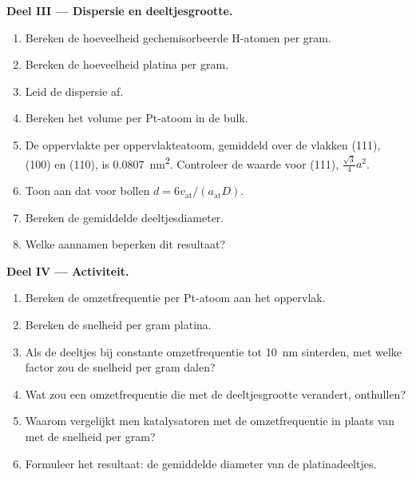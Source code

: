 \begin{problem}
\medskip\noindent\textbf{Deel III --- Dispersie en deeltjesgrootte.}
\begin{enumerate}[resume]
  \item Bereken de hoeveelheid gechemisorbeerde H-atomen per gram.
  \item Bereken de hoeveelheid platina per gram.
  \item Leid de dispersie af.
  \item Bereken het volume per Pt-atoom in de bulk.
  \item De oppervlakte per oppervlakteatoom, gemiddeld over de vlakken
        (111), (100) en (110), is \qty{0.0807}{nm^2}. Controleer de waarde
        voor (111), $\frac{\sqrt3}{4}a^2$.
  \item Toon aan dat voor bollen $d = 6v_{\mathrm{at}}/(a_{\mathrm{at}}D)$.
  \item Bereken de gemiddelde deeltjesdiameter.
  \item Welke aannamen beperken dit resultaat?
\end{enumerate}

\medskip\noindent\textbf{Deel IV --- Activiteit.}
\begin{enumerate}[resume]
  \item Bereken de omzetfrequentie per Pt-atoom aan het oppervlak.
  \item Bereken de snelheid per gram platina.
  \item Als de deeltjes bij constante omzetfrequentie tot \qty{10}{nm}
        sinterden, met welke factor zou de snelheid per gram dalen?
  \item Wat zou een omzetfrequentie die met de deeltjesgrootte verandert,
        onthullen?
  \item Waarom vergelijkt men katalysatoren met de omzetfrequentie in
        plaats van met de snelheid per gram?
  \item Formuleer het resultaat: de gemiddelde diameter van de
        platinadeeltjes.
\end{enumerate}
\end{problem}

